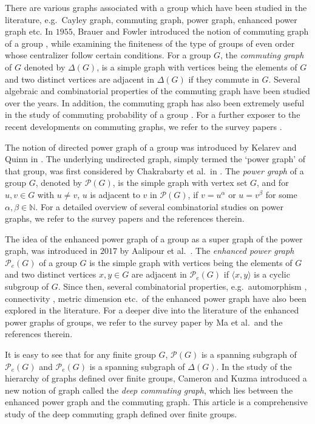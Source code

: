 \documentclass[12pt,a4paper]{article}
\begin{document}
There are various graphs associated with a group which have been studied in the literature, e.g.~Cayley graph, commuting graph, power graph, enhanced power graph etc. In $1955$, Brauer and Fowler introduced the notion of commuting graph of a group \cite{BF}, while examining the finiteness of the type of groups of even order whose centralizer follow certain conditions. For a group $G$, the \textit{commuting graph} of $G$ denoted by $\Delta(G)$, is a simple graph with vertices being the elements of $G$ and two distinct vertices are adjacent in $\Delta(G)$ if they commute in $G$. Several algebraic and combinatorial properties of the commuting graph have been studied over the years. In addition, the commuting graph has also been extremely useful in the study of commuting probability of a group \cite{eberhard, guralnick}. For a further exposer to the recent developments on commuting graphs, we refer to the survey papers \cite{arvind, cameron}.

The notion of directed power graph of a group was introduced by Kelarev and Quinn in \cite{ker1}. The underlying undirected graph, simply termed the `power graph' of that group, was first considered by Chakrabarty et al.~in \cite{ivy}. The {\it power graph} of a group $G$, denoted by $\mathcal{P}(G)$, is the simple graph with vertex set $G$, and for $u,v\in G$ with $u\neq v$, $u$ is adjacent to $v$ in $\mathcal{P}(G)$, if $v=u^{\alpha}$ or $u=v^{\beta}$ for some $\alpha,\beta\in \mathbb{N}$. For a detailed overview of several combinatorial studies on power graphs, we refer to the survey papers \cite{AKC, KSCC} and the references therein.

The idea of the enhanced power graph of a group as a super graph of the power graph, was introduced in $2017$ by Aalipour et al.~\cite{aa}. The \textit{enhanced power graph} $\mathcal{P}_e(G)$ of a group $G$ is the simple graph with vertices being the elements of $G$ and two distinct vertices $x,y\in G$ are adjacent in $\mathcal{P}_e(G)$ if $\langle x,y\rangle$ is a cyclic subgroup of $G$. Since then, several combinatorial properties, e.g.~automorphism \cite{zahirovic}, connectivity \cite{bera2, bera4, bera}, metric dimension \cite{ma2} etc.~of the enhanced power graph have also been explored in the literature. For a deeper dive into the literature of the enhanced power graphs of groups, we refer to the survey paper \cite{make} by Ma et al.~and the references therein.

It is easy to see that for any finite group $G$, $\mathcal{P}(G)$ is a spanning subgraph of $\mathcal{P}_e(G)$ and $\mathcal{P}_e(G)$ is a spanning subgraph of $\Delta(G)$. In the study of the hierarchy of graphs defined over finite groups, Cameron and Kuzma \cite{deepc} introduced a new notion of graph called the \textit{deep commuting graph}, which lies between the enhanced power graph and the commuting graph. This article is a comprehensive study of the deep commuting graph defined over finite groups.
\end{document}
